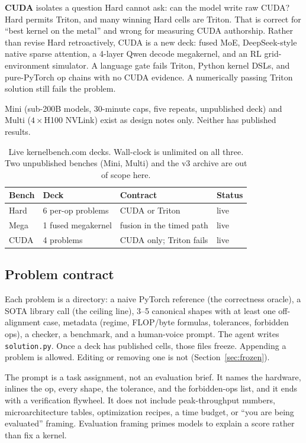\documentclass[11pt]{article}
\begin{document}
\textbf{CUDA} isolates a question Hard cannot ask: can the model write raw CUDA? Hard permits Triton, and many winning Hard cells are Triton. That is correct for ``best kernel on the metal'' and wrong for measuring CUDA authorship. Rather than revise Hard retroactively, CUDA is a new deck: fused MoE, DeepSeek-style native sparse attention, a 4-layer Qwen decode megakernel, and an RL grid-environment simulator. A language gate fails Triton, Python kernel DSLs, and pure-PyTorch op chains with no CUDA evidence. A numerically passing Triton solution still fails the problem.

Mini (sub-200B models, 30-minute caps, five repeats, unpublished deck) and Multi ($4{\times}$H100 NVLink) exist as design notes only. Neither has published results.

\begin{table}[!ht]
\centering
\small
\begin{tabular}{@{}llll@{}}
\toprule
Bench & Deck & Contract & Status \\
\midrule
Hard & 6 per-op problems & CUDA or Triton & live \\
Mega & 1 fused megakernel & fusion in the timed path & live \\
CUDA & 4 problems & CUDA only; Triton fails & live \\
\bottomrule
\end{tabular}
\caption{Live kernelbench.com decks. Wall-clock is unlimited on all three. Two unpublished benches (Mini, Multi) and the v3 archive are out of scope here.}
\label{tab:decks}
\end{table}

\subsection{Problem contract}
\label{sec:anatomy}

Each problem is a directory: a naive PyTorch reference (the correctness oracle), a SOTA library call (the ceiling line), 3--5 canonical shapes with at least one off-alignment case, metadata (regime, FLOP/byte formulas, tolerances, forbidden ops), a checker, a benchmark, and a human-voice prompt. The agent writes \texttt{solution.py}. Once a deck has published cells, those files freeze. Appending a problem is allowed. Editing or removing one is not (Section~\ref{sec:frozen}).

The prompt is a task assignment, not an evaluation brief. It names the hardware, inlines the op, every shape, the tolerance, and the forbidden-ops list, and it ends with a verification flywheel. It does not include peak-throughput numbers, microarchitecture tables, optimization recipes, a time budget, or ``you are being evaluated'' framing. Evaluation framing primes models to explain a score rather than fix a kernel.
\end{document}

